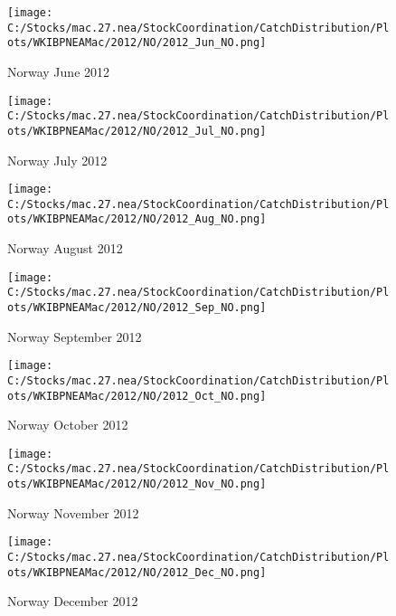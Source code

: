 \documentclass{article}
\begin{document}
\begin{figure}
	\centering
		\texttt{[image: C:/Stocks/mac.27.nea/StockCoordination/CatchDistribution/Plots/WKIBPNEAMac/2012/NO/2012\_Jun\_NO.png]}
	\caption{Norway June 2012}
	\label{fig:2012_Jun_NO}
\end{figure}

\begin{figure}
	\centering
		\texttt{[image: C:/Stocks/mac.27.nea/StockCoordination/CatchDistribution/Plots/WKIBPNEAMac/2012/NO/2012\_Jul\_NO.png]}
	\caption{Norway July 2012}
	\label{fig:2012_Jul_NO}
\end{figure}

\begin{figure}
	\centering
		\texttt{[image: C:/Stocks/mac.27.nea/StockCoordination/CatchDistribution/Plots/WKIBPNEAMac/2012/NO/2012\_Aug\_NO.png]}
	\caption{Norway August 2012}
	\label{fig:2012_Aug_NO}
\end{figure}

\begin{figure}
	\centering
		\texttt{[image: C:/Stocks/mac.27.nea/StockCoordination/CatchDistribution/Plots/WKIBPNEAMac/2012/NO/2012\_Sep\_NO.png]}
	\caption{Norway September 2012}
	\label{fig:2012_Sep_NO}
\end{figure}

\begin{figure}
	\centering
		\texttt{[image: C:/Stocks/mac.27.nea/StockCoordination/CatchDistribution/Plots/WKIBPNEAMac/2012/NO/2012\_Oct\_NO.png]}
	\caption{Norway October 2012}
	\label{fig:2012_Oct_NO}
\end{figure}

\begin{figure}
	\centering
		\texttt{[image: C:/Stocks/mac.27.nea/StockCoordination/CatchDistribution/Plots/WKIBPNEAMac/2012/NO/2012\_Nov\_NO.png]}
	\caption{Norway November 2012}
	\label{fig:2012_Nov_NO}
\end{figure}

\begin{figure}
	\centering
		\texttt{[image: C:/Stocks/mac.27.nea/StockCoordination/CatchDistribution/Plots/WKIBPNEAMac/2012/NO/2012\_Dec\_NO.png]}
	\caption{Norway December 2012}
	\label{fig:2012_Dec_NO}
\end{figure}

\clearpage

\newpage
\end{document}
